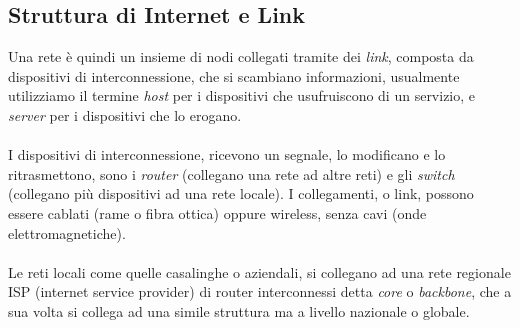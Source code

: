 \documentclass[12pt, letterpaper]{article}
\newcommand{\acc}{\\\hphantom{}\\}
\begin{document}
\subsection{Struttura di Internet e Link}  
Una rete è quindi un insieme di nodi collegati tramite dei \textit{link}, composta da dispositivi di interconnessione, che 
si scambiano informazioni, usualmente utilizziamo il termine \textit{host} per i dispositivi che usufruiscono di un servizio, 
e \textit{server} per i dispositivi che lo erogano.\acc 
I dispositivi di interconnessione, ricevono un segnale, lo modificano e lo ritrasmettono, sono i \textit{router} (collegano una 
rete ad altre reti) e gli  \textit{switch} (collegano più dispositivi ad una rete locale). I collegamenti, o link, possono 
essere cablati (rame o fibra ottica) oppure wireless, senza cavi (onde elettromagnetiche).\acc 
Le reti locali come quelle casalinghe o aziendali, si collegano ad una rete regionale ISP (internet service provider) di router interconnessi detta 
\textit{core} o \textit{backbone}, che a sua volta si collega ad una simile struttura ma a livello nazionale o globale.\acc 
\end{document}
